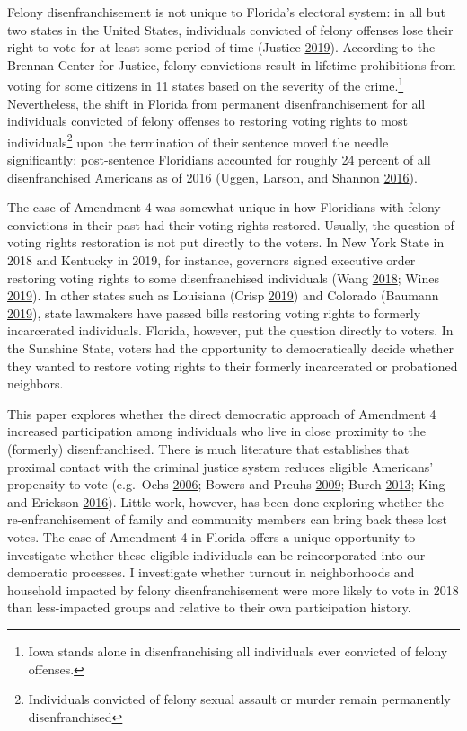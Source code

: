 \documentclass[
  12pt,
]{article}
\begin{document}
Felony disenfranchisement is not unique to Florida's electoral system: in all but two states in the United States, individuals convicted of felony offenses lose their right to vote for at least some period of time (Justice \protect\hyperlink{ref-bcj_laws}{2019}). According to the Brennan Center for Justice, felony convictions result in lifetime prohibitions from voting for some citizens in 11 states based on the severity of the crime.\footnote{Iowa stands alone in disenfranchising all individuals ever convicted of felony offenses.} Nevertheless, the shift in Florida from permanent disenfranchisement for all individuals convicted of felony offenses to restoring voting rights to most individuals\footnote{Individuals convicted of felony sexual assault or murder remain permanently disenfranchised} upon the termination of their sentence moved the needle significantly: post-sentence Floridians accounted for roughly 24 percent of all disenfranchised Americans as of 2016 (Uggen, Larson, and Shannon \protect\hyperlink{ref-sentencing_2016}{2016}).

The case of Amendment 4 was somewhat unique in how Floridians with felony convictions in their past had their voting rights restored. Usually, the question of voting rights restoration is not put directly to the voters. In New York State in 2018 and Kentucky in 2019, for instance, governors signed executive order restoring voting rights to some disenfranchised individuals (Wang \protect\hyperlink{ref-Wang2018}{2018}; Wines \protect\hyperlink{ref-Wines2019}{2019}). In other states such as Louisiana (Crisp \protect\hyperlink{ref-Crisp2019}{2019}) and Colorado (Baumann \protect\hyperlink{ref-Baumann2019}{2019}), state lawmakers have passed bills restoring voting rights to formerly incarcerated individuals. Florida, however, put the question directly to voters. In the Sunshine State, voters had the opportunity to democratically decide whether they wanted to restore voting rights to their formerly incarcerated or probationed neighbors.

This paper explores whether the direct democratic approach of Amendment 4 increased participation among individuals who live in close proximity to the (formerly) disenfranchised. There is much literature that establishes that proximal contact with the criminal justice system reduces eligible Americans' propensity to vote (e.g.~Ochs \protect\hyperlink{ref-Ochs2006}{2006}; Bowers and Preuhs \protect\hyperlink{ref-Bowers2009}{2009}; Burch \protect\hyperlink{ref-Burch2013}{2013}; King and Erickson \protect\hyperlink{ref-King2016}{2016}). Little work, however, has been done exploring whether the re-enfranchisement of family and community members can bring back these lost votes. The case of Amendment 4 in Florida offers a unique opportunity to investigate whether these eligible individuals can be reincorporated into our democratic processes. I investigate whether turnout in neighborhoods and household impacted by felony disenfranchisement were more likely to vote in 2018 than less-impacted groups and relative to their own participation history.
\end{document}
